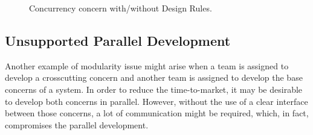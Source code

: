 \begin{figure}[h]
    \begin{center}
        \caption{Concurrency concern with/without Design Rules.}
    \end{center}
\end{figure}

\subsection{Unsupported Parallel Development}

Another example of modularity issue might arise when a team is
assigned to develop a crosscutting concern and another team is
assigned to develop the base concerns of a system. In order to
reduce the time-to-market, it may be desirable to develop both
concerns in parallel. However, without the use of a clear interface
between those concerns, a lot of communication might be required,
which, in fact, compromises the parallel development.

